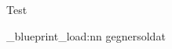 \documentclass{pnpprep}
\begin{document}
Test

\ExplSyntaxOn
\pnp_blueprint_load:nn {gegner}{soldat}
\ExplSyntaxOff
\end{document}
